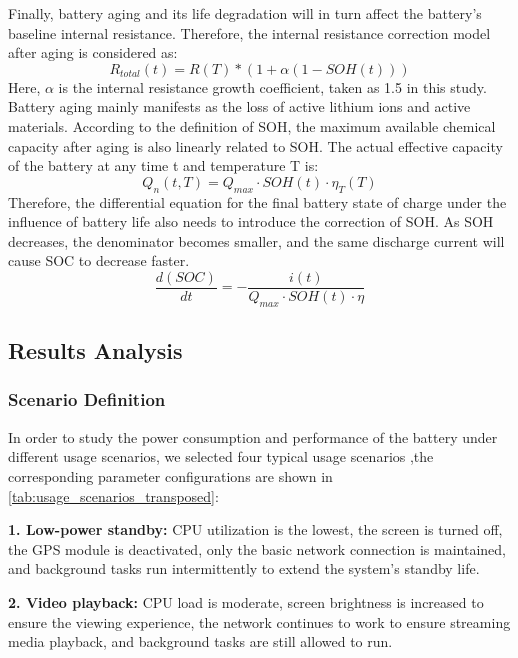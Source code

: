 \documentclass{mcmthesis}
\begin{document}
Finally, battery aging and its life degradation will in turn affect the battery's baseline internal resistance. Therefore, the internal resistance correction model after aging is considered as:
\begin{equation}
  R_{total}(t)=R(T)\ast(1+\alpha(1-SOH(t)))
\end{equation}
Here, $\alpha$ is the internal resistance growth coefficient, taken as 1.5 in this study.
Battery aging mainly manifests as the loss of active lithium ions and active materials. According to the definition of SOH, the maximum available chemical capacity after aging is also linearly related to SOH. The actual effective capacity of the battery at any time t and temperature T is:
\begin{equation}
  Q_n(t,T)=Q_{max}\cdot SOH(t)\cdot\eta_T(T)
\end{equation}
Therefore, the differential equation for the final battery state of charge under the influence of battery life also needs to introduce the correction of SOH. As SOH decreases, the denominator becomes smaller, and the same discharge current will cause SOC to decrease faster.
\begin{equation}
  \frac{d(SOC)}{dt}=-\frac{i(t)}{Q_{max}\cdot S O H(t)\cdot\eta}
\end{equation}

\subsection{Results Analysis}
\subsubsection*{Scenario Definition}
In order to study the power consumption and performance of the battery under different usage scenarios, we selected four typical usage scenarios ,the corresponding parameter configurations are shown in \autoref{tab:usage_scenarios_transposed}: 

\textbf{1. Low-power standby:} 
CPU utilization is the lowest, the screen is turned off, the GPS module is deactivated, only the basic network connection is maintained, and background tasks run intermittently to extend the system's standby life.

\vspace{-3pt}
\textbf{2. Video playback:} 
CPU load is moderate, screen brightness is increased to ensure the viewing experience, the network continues to work to ensure streaming media playback, and background tasks are still allowed to run.
\end{document}
